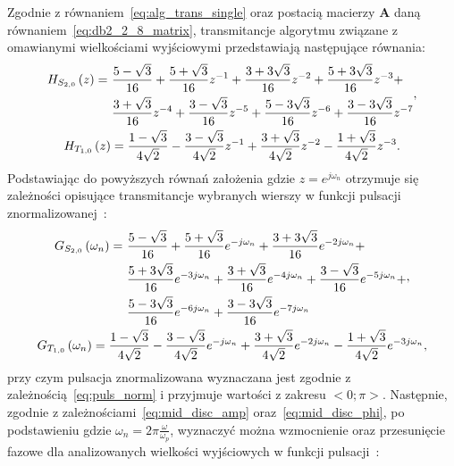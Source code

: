 Zgodnie z równaniem~\eqref{eq:alg_trans_single} oraz postacią macierzy $\mathbf{A}$ daną równaniem~\eqref{eq:db2_2_8_matrix}, transmitancje algorytmu związane z omawianymi wielkościami wyjściowymi przedstawiają następujące równania:
\begin{gather}
\begin{split}
H_{S_{2,0}} \left(z\right) = ~
& \frac{5 - \sqrt{3}}{16} + \frac{5 + \sqrt{3}}{16} z^{-1} + \frac{3 + 3 \sqrt{3}}{16} z^{-2} + \frac{5 + 3 \sqrt{3}}{16} z^{-3} + \\
& \frac{3 + \sqrt{3}}{16} z^{-4} + \frac{3 - \sqrt{3}}{16} z^{-5} + \frac{5 - 3 \sqrt{3}}{16} z^{-6} + \frac{3 - 3 \sqrt{3}}{16} z^{-7}
\end{split}
\label{eq:sym_partd_output_trans_z_S_2_0}, \\
H_{T_{1,0}} \left(z\right) = \frac{1 - \sqrt{3}}{4 \sqrt{2}} - \frac{3 - \sqrt{3}}{4 \sqrt{2}} z^{-1} + \frac{3 + \sqrt{3}}{4 \sqrt{2}} z^{-2} - \frac{1 + \sqrt{3}}{4 \sqrt{2}} z^{-3} \label{eq:sym_partd_output_trans_z_T_1_0}.
\end{gather}
Podstawiając do powyższych równań założenia gdzie $z = e^{j\omega_{n}}$ otrzymuje się zależności opisujące transmitancje wybranych wierszy w funkcji pulsacji znormalizowanej~\cite{oppenheim_dsp}:
\begin{gather}
\begin{split}
G_{S_{2,0}} \left(\omega_{n}\right) = ~
& \frac{5 - \sqrt{3}}{16} + \frac{5 + \sqrt{3}}{16} e^{-j\omega_{n}} + \frac{3 + 3 \sqrt{3}}{16} e^{-2j\omega_{n}} + \\
& \frac{5 + 3 \sqrt{3}}{16} e^{-3j\omega_{n}} + \frac{3 + \sqrt{3}}{16} e^{-4j\omega_{n}} + \frac{3 - \sqrt{3}}{16} e^{-5j\omega_{n}} + \\
& \frac{5 - 3 \sqrt{3}}{16} e^{-6j\omega_{n}} + \frac{3 - 3 \sqrt{3}}{16} e^{-7j\omega_{n}}
\end{split}
\label{eq:sym_partd_output_trans_wn_S_2_0}, \\
G_{T_{1,0}} \left(\omega_{n}\right) = \frac{1 - \sqrt{3}}{4 \sqrt{2}} - \frac{3 - \sqrt{3}}{4 \sqrt{2}} e^{-j\omega_{n}} + \frac{3 + \sqrt{3}}{4 \sqrt{2}} e^{-2j\omega_{n}} - \frac{1 + \sqrt{3}}{4 \sqrt{2}} e^{-3j\omega_{n}} \label{eq:sym_partd_output_trans_wn_T_1_0},
\end{gather}
przy czym pulsacja znormalizowana wyznaczana jest zgodnie z zależnością~\eqref{eq:puls_norm} i przyjmuje wartości z zakresu $<0;\pi>$. Następnie, zgodnie z zależnościami~\eqref{eq:mid_disc_amp} oraz~\eqref{eq:mid_disc_phi}, po podstawieniu gdzie $\omega_{n} = 2\pi \frac{\omega}{\omega_{p}}$, wyznaczyć można wzmocnienie oraz przesunięcie fazowe dla analizowanych wielkości wyjściowych w funkcji pulsacji~\cite{proakis_dsp}:
